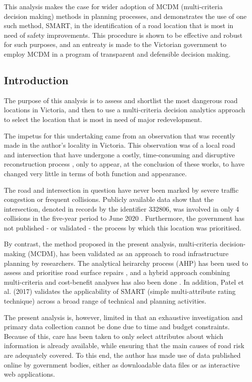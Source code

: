 \documentclass[11pt, a4paper]{article}
\begin{document}
    This analysis makes the case for wider adoption of MCDM (multi-criteria decision making) methods in planning processes, and demonstrates the use of one such method, SMART, in the identification of a road location that is most in need of safety improvements. This procedure is shown to be effective and robust for such purposes, and an entreaty is made to the Victorian government to employ MCDM in a program of transparent and defensible decision making.

    \subsection{Introduction}

    The purpose of this analysis is to assess and shortlist the most dangerous road locations in Victoria, and then to use a multi-criteria decision analytics approach to select the location that is most in need of major redevelopment.

    The impetus for this undertaking came from an observation that was recently made in the author's locality in Victoria. This observation was of a local road and intersection that have undergone a costly, time-consuming and disruptive reconstruction process \parencite{a2}, only to appear, at the conclusion of these works, to have changed very little in terms of both function and appearance.

    The road and intersection in question have never been marked by severe traffic congestion or frequent collisions. Publicly available data show that the intersection, denoted in records by the identifier 332806, was involved in only 4 collisions in the five-year period to June 2020 \parencite{a3}. Furthermore, the government has not published - or validated - the process by which this location was prioritised.

    By contrast, the method proposed in the present analysis, multi-criteria decision-making (MCDM), has been validated as an approach to road infrastructure planning by researchers. The analytical heirarchy process (AHP) has been used to assess and prioritise road surface repairs \parencite{a4}, and a hybrid approach combining multi-criteria and cost-benefit analyses has also been done \parencite{a5}. In addition, Patel et al. (2017) validates the applicability of SMART (simple multi-attribute rating technique) across a broad range of technical and planning activities.

    The present analysis is, however, limited in that an exhaustive investigation and primary data collection cannot be done due to time and budget constraints. Because of this, care has been taken to only select attributes about which information is already available, while ensuring that the main causes of road risk are adequately covered. To this end, the author has made use of data published online by government bodies, either as downloadable data files or as interactive web applications.
\end{document}
